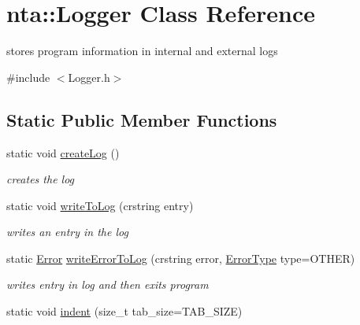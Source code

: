 \hypertarget{classnta_1_1Logger}{}\section{nta\+:\+:Logger Class Reference}
\label{classnta_1_1Logger}


stores program information in internal and external logs  




{\ttfamily \#include $<$Logger.\+h$>$}

\subsection*{Static Public Member Functions}
\begin{DoxyCompactItemize}
\item 
\mbox{\label{classnta_1_1Logger_a308a3ec22f996556b3d54737ace33543}} 
static void \hyperlink{classnta_1_1Logger_a308a3ec22f996556b3d54737ace33543}{create\+Log} ()
\begin{DoxyCompactList}\small\item\em creates the log \end{DoxyCompactList}\item 
\mbox{\label{classnta_1_1Logger_a71196417598ddd975959924c2ce53c13}} 
static void \hyperlink{classnta_1_1Logger_a71196417598ddd975959924c2ce53c13}{write\+To\+Log} (crstring entry)
\begin{DoxyCompactList}\small\item\em writes an entry in the log \end{DoxyCompactList}\item 
static \hyperlink{structnta_1_1Error}{Error} \hyperlink{classnta_1_1Logger_a22e0cfbb0e04de2c377cdd5297c39eee}{write\+Error\+To\+Log} (crstring error, \hyperlink{namespacenta_a1ddeff35318678e360dfa44ca9577b16}{Error\+Type} type=O\+T\+H\+ER)
\begin{DoxyCompactList}\small\item\em writes entry in log and then exits program \end{DoxyCompactList}\item 
\mbox{\label{classnta_1_1Logger_aae8be3709ec3023f987f9b70304cd641}} 
static void \hyperlink{classnta_1_1Logger_aae8be3709ec3023f987f9b70304cd641}{indent} (size\+\_\+t tab\+\_\+size=T\+A\+B\+\_\+\+S\+I\+ZE)

\end{DoxyCompactItemize}
